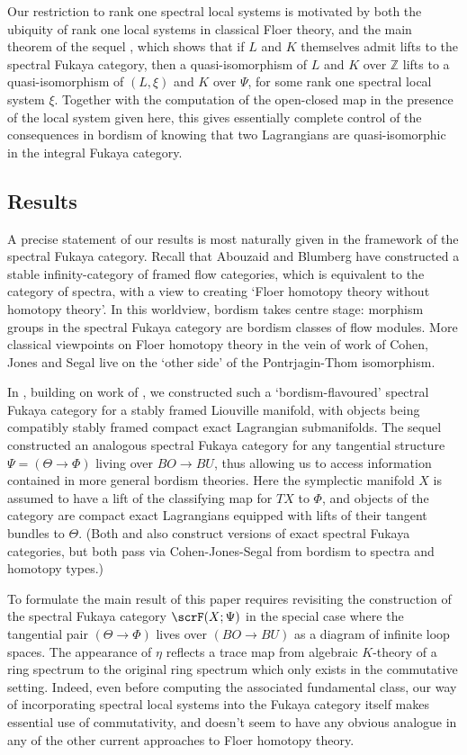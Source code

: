 \documentclass{TPmod}
\def\bZ{\mathbb{Z}}
\def\bZ{\mathbb{Z}}
\numberwithin{equation}{section}
\begin{document}
   Our restriction to rank one spectral local systems is motivated by both the ubiquity of rank one local systems in classical Floer theory, and the main theorem of the sequel \cite{PS4}, which shows that if $L$ and $K$ themselves admit lifts to the spectral Fukaya category, then a quasi-isomorphism of $L$ and $K$ over $\bZ$ lifts to a quasi-isomorphism of $(L,\xi)$ and $K$ over $\Psi$, for some rank one spectral local system $\xi$. 
 Together with the computation of the open-closed map in the presence of the local system given here, this gives essentially complete control of the consequences in  bordism of knowing that two Lagrangians are quasi-isomorphic in the integral Fukaya category. 
 
 \subsection{Results}


A precise statement of our results is most naturally given in the framework of the spectral Fukaya category.  Recall that 
Abouzaid and Blumberg \cite{AB} have constructed a stable infinity-category of framed flow categories, which is equivalent to the category of spectra, with a view to creating `Floer homotopy theory without homotopy theory'. In this worldview, bordism takes centre stage: morphism groups in the spectral Fukaya category are bordism classes of flow modules.  More classical viewpoints on Floer homotopy theory in the vein of work of Cohen, Jones and Segal live on the `other side' of the Pontrjagin-Thom isomorphism. 

 In \cite{PS}, building on work of \cite{Large,FO3:smoothness}, we constructed such a `bordism-flavoured'  spectral Fukaya category for a stably framed Liouville manifold, with objects being compatibly stably framed compact exact Lagrangian submanifolds. The sequel \cite{PS2} constructed an analogous spectral Fukaya category for any tangential structure $\Psi = (\Theta \to \Phi)$ living over $BO \to BU$, thus allowing us to access information contained in more general bordism theories. Here the symplectic manifold $X$ is assumed to have a lift of the classifying map for $TX$ to $\Phi$, and objects of the category are compact exact Lagrangians equipped with lifts of their tangent bundles to $\Theta$. (Both \cite{Large} and \cite{ADP} also construct versions of exact spectral Fukaya categories, but both pass via Cohen-Jones-Segal from bordism to spectra and homotopy types.)


To formulate the main result of this paper requires revisiting the construction of the spectral Fukaya category $\scrF(X;\Psi)$ in the special case where the tangential pair $(\Theta \to \Phi)$ lives over $(BO \to BU)$ as a diagram of infinite loop spaces. The appearance of $\eta$ reflects a trace map from algebraic $K$-theory of a ring spectrum to the original ring spectrum which only exists in the commutative setting.  Indeed, even before computing the associated fundamental class, our way of incorporating spectral local systems into the Fukaya category itself makes essential use of commutativity, and doesn't seem to have any obvious analogue in any of the other current approaches to Floer homotopy theory.
\end{document}
